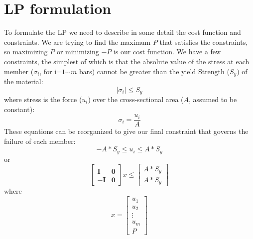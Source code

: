 \documentclass[12pt]{article}
\newcommand{\bm}[1]{\boldsymbol{#1}}
\begin{document}
\section{LP formulation}
To formulate the LP we need to describe in some detail the cost function and constraints.  We are trying to find the maximum $P$ that satisfies the constraints, so maximizing $P$ or minimizing $-P$ is our cost function.  We have a few constraints, the simplest of which is that the absolute value of the stress at each member ($\sigma_i$, for i=$1\cdots m$ bars) cannot be greater than the yield Strength ($S_y$) of the material:
\begin{equation}
|\sigma_i| \leq S_y
\end{equation}
where stress is the force ($u_i$) over the cross-sectional area ($A$, assumed to be constant):
\begin{equation}
\sigma_i = \frac{u_i}{A}
\end{equation}
These equations can be reorganized to give our final constraint that governs the failure of each member:
\begin{equation}
 -A*S_y \leq u_i \leq A*S_y
\end{equation}
or
\begin{equation}
\left[
\begin{array}{rr}
\bm{I} & \bm{0}\\
-\bm{I} & \bm{0}
\end{array}
\right]
x \leq
\left[
\begin{array}{c}
A*S_y\\
A*S_y
\end{array}
\right]
\end{equation}
where
\begin{equation}
x = \left[
\begin{array}{c}
u_1\\
u_2\\
\vdots\\
u_m\\
P
\end{array}
\right]
\end{equation}
\end{document}
